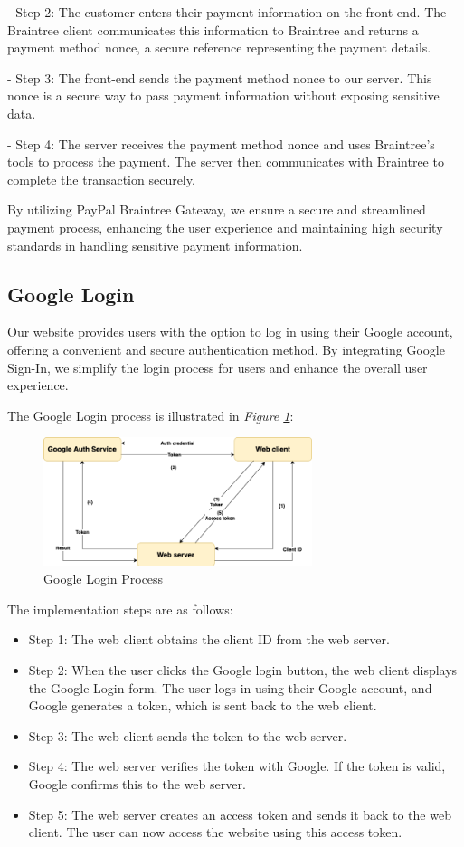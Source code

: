 - Step 2:
The customer enters their payment information on the front-end. The Braintree client communicates this information to Braintree and returns a payment method nonce, a secure reference representing the payment details.

- Step 3:
The front-end sends the payment method nonce to our server. This nonce is a secure way to pass payment information without exposing sensitive data.

- Step 4:
The server receives the payment method nonce and uses Braintree's tools to process the payment. The server then communicates with Braintree to complete the transaction securely.

By utilizing PayPal Braintree Gateway, we ensure a secure and streamlined payment process, enhancing the user experience and maintaining high security standards in handling sensitive payment information.

\subsection{Google Login}
Our website provides users with the option to log in using their Google account,
offering a convenient and secure authentication method. By integrating Google Sign-In,
we simplify the login process for users and enhance the overall user experience.

The Google Login process is illustrated in \emph{Figure \ref{fig:gglogin-flow}}:
\begin{figure}[H]
    \centering
    \includegraphics[width=0.7\textwidth]{Figures/Implementation/GoogleLogin.png}
    \caption{Google Login Process}
    \label{fig:gglogin-flow}
\end{figure}

The implementation steps are as follows:
\begin{itemize}
    \item Step 1: The web client obtains the client ID from the web server.
    \item Step 2: When the user clicks the Google login button, the web client displays the Google Login form. The user logs in using their Google account, and Google generates a token, which is sent back to the web client.
    \item Step 3: The web client sends the token to the web server.
    \item Step 4: The web server verifies the token with Google. If the token is valid, Google confirms this to the web server.
    \item Step 5: The web server creates an access token and sends it back to the web client. The user can now access the website using this access token.
\end{itemize}

